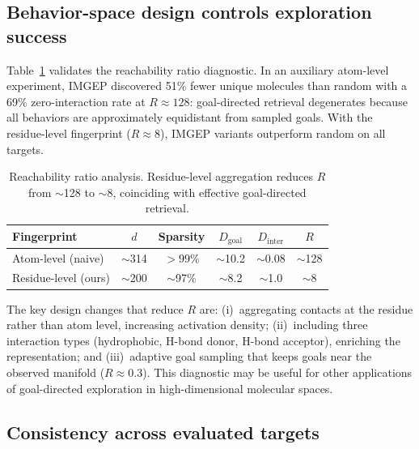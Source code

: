 \documentclass[journal=jcisd8,manuscript=article]{achemso}
\begin{document}
\subsection{Behavior-space design controls exploration success}

Table~\ref{tab:reachability} validates the reachability ratio diagnostic. In an auxiliary atom-level experiment, IMGEP discovered 51\% fewer unique molecules than random with a 69\% zero-interaction rate at $R \approx 128$: goal-directed retrieval degenerates because all behaviors are approximately equidistant from sampled goals. With the residue-level fingerprint ($R \approx 8$), IMGEP variants outperform random on all targets.

\begin{table}[ht]
\centering
\caption{Reachability ratio analysis. Residue-level aggregation reduces $R$ from $\sim$128 to $\sim$8, coinciding with effective goal-directed retrieval.}
\label{tab:reachability}
\begin{tabular}{lccccc}
\toprule
\textbf{Fingerprint} & $d$ & \textbf{Sparsity} & $D_\text{goal}$ & $D_\text{inter}$ & $R$ \\
\midrule
Atom-level (naive) & $\sim$314 & $>99\%$ & $\sim$10.2 & $\sim$0.08 & $\sim$128 \\
Residue-level (ours) & $\sim$200 & $\sim$97\% & $\sim$8.2 & $\sim$1.0 & $\sim$8 \\
\bottomrule
\end{tabular}
\end{table}

The key design changes that reduce $R$ are: (i)~aggregating contacts at the residue rather than atom level, increasing activation density; (ii)~including three interaction types (hydrophobic, H-bond donor, H-bond acceptor), enriching the representation; and (iii)~adaptive goal sampling that keeps goals near the observed manifold ($R \approx 0.3$). This diagnostic may be useful for other applications of goal-directed exploration in high-dimensional molecular spaces.

\subsection{Consistency across evaluated targets}
\end{document}
